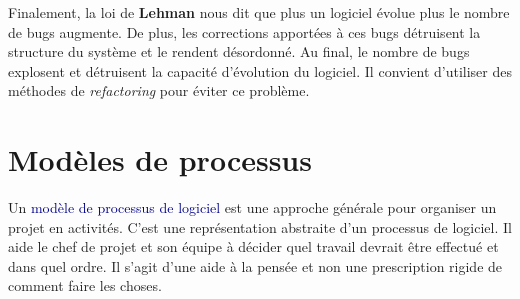 \documentclass{article}
\newcommand{\blu}[1]{\textcolor{darkblue}{#1}}
\begin{document}
\begin{sffamily}
Finalement, la loi de \textbf{Lehman} nous dit que plus un logiciel évolue plus le nombre de bugs augmente. De plus, les 
corrections apportées à ces bugs détruisent la structure du système et le rendent désordonné. Au final, le nombre de bugs 
explosent et détruisent la capacité d'évolution du logiciel. Il convient d'utiliser des méthodes de \textit{refactoring} pour 
éviter ce problème.

\newpage

\section{Modèles de processus}

Un \blu{modèle de processus de logiciel} est une approche générale pour organiser un projet en activités. C'est une 
représentation abstraite d'un processus de logiciel. Il aide le chef de projet et son équipe à décider quel travail devrait être 
effectué et dans quel ordre. Il s'agit d'une aide à la pensée et non une prescription rigide de comment faire les choses.\\


\end{sffamily}
\end{document}
